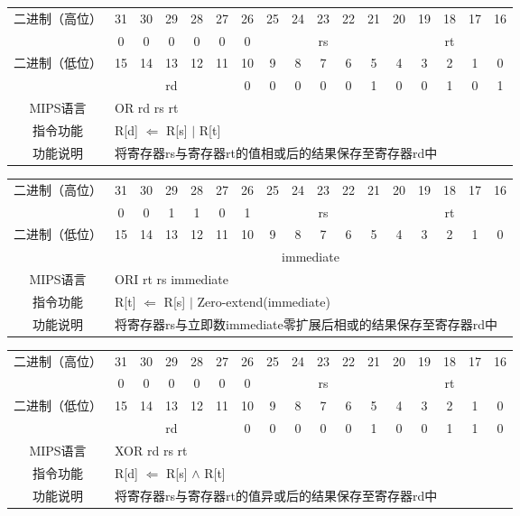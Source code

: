 \begin{table}
\begin{tabular}{|c|c|c|c|c|c|c|c|c|c|c|c|c|c|c|c|c|}
\hline
\multirow{2}{*}{二进制（高位）} &
31&30&29&28&27&26&25&24&23&22&21&20&19&18&17&16\\
\cline{2-17}
&
0&0&0&0&0&
0&
\multicolumn{5}{c|}{rs}&
\multicolumn{5}{c|}{rt}\\
\hline
\multirow{2}{*}{二进制（低位）} &
15&14&13&12&11&10&9&8&7&6&5&4&3&2&1&0\\
\cline{2-17}
&
\multicolumn{5}{c|}{rd}&
0&0&0&0&0&
1&0&0&1&0&
1\\
\hline
MIPS语言&
\multicolumn{16}{l|}{OR rd rs rt}\\
\hline
指令功能&
\multicolumn{16}{l|}{R[d] $\Leftarrow$ R[s] $\mid$ R[t]}\\
\hline
功能说明&
\multicolumn{16}{l|}{将寄存器rs与寄存器rt的值相或后的结果保存至寄存器rd中}\\
\hline
\end{tabular}
\end{table}

\begin{table}
\begin{tabular}{|c|c|c|c|c|c|c|c|c|c|c|c|c|c|c|c|c|}
\hline
\multirow{2}{*}{二进制（高位）} &
31&30&29&28&27&26&25&24&23&22&21&20&19&18&17&16\\
\cline{2-17}
&
0&0&1&1&0&
1&
\multicolumn{5}{c|}{rs}&
\multicolumn{5}{c|}{rt}\\
\hline
\multirow{2}{*}{二进制（低位）} &
15&14&13&12&11&10&9&8&7&6&5&4&3&2&1&0\\
\cline{2-17}
&
\multicolumn{16}{c|}{immediate}\\
\hline
MIPS语言&
\multicolumn{16}{l|}{ORI rt rs immediate}\\
\hline
指令功能&
\multicolumn{16}{l|}{R[t] $\Leftarrow$ R[s] $\mid$ Zero-extend(immediate)}\\
\hline
功能说明&
\multicolumn{16}{l|}{将寄存器rs与立即数immediate零扩展后相或的结果保存至寄存器rd中}\\
\hline
\end{tabular}
\end{table}

\begin{table}
\begin{tabular}{|c|c|c|c|c|c|c|c|c|c|c|c|c|c|c|c|c|}
\hline
\multirow{2}{*}{二进制（高位）} &
31&30&29&28&27&26&25&24&23&22&21&20&19&18&17&16\\
\cline{2-17}
&
0&0&0&0&0&
0&
\multicolumn{5}{c|}{rs}&
\multicolumn{5}{c|}{rt}\\
\hline
\multirow{2}{*}{二进制（低位）} &
15&14&13&12&11&10&9&8&7&6&5&4&3&2&1&0\\
\cline{2-17}
&
\multicolumn{5}{c|}{rd}&
0&0&0&0&0&
1&0&0&1&1&
0\\
\hline
MIPS语言&
\multicolumn{16}{l|}{XOR rd rs rt}\\
\hline
指令功能&
\multicolumn{16}{l|}{R[d] $\Leftarrow$ R[s] $\wedge$ R[t]}\\
\hline
功能说明&
\multicolumn{16}{l|}{将寄存器rs与寄存器rt的值异或后的结果保存至寄存器rd中}\\
\hline
\end{tabular}
\end{table}

